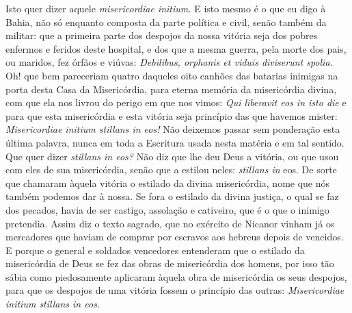 Isto quer dizer aquele \emph{misericordiae initium.} E isto mesmo é o
que eu digo à Bahia, não só enquanto composta da parte política e civil,
senão também da militar: que a primeira parte dos despojos da nossa
vitória seja dos pobres enfermos e feridos deste hospital, e dos que a
mesma guerra, pela morte dos pais, ou maridos, fez órfãos e viúvas:
\emph{Debilibus, orphanis et viduis diviserunt spolia.} Oh! que bem
pareceriam quatro daqueles oito canhões das batarias inimigas na porta
desta Casa da Misericórdia, para eterna memória da misericórdia divina,
com que ela nos livrou do perigo em que nos vimos: \emph{Qui liberavit
eos in isto die} e para que esta misericórdia e esta vitória seja
princípio das que havemos mister: \emph{Misericordiae initium stillans
in eos!} Não deixemos passar sem ponderação esta última palavra, nunca
em toda a Escritura usada nesta matéria e em tal sentido. Que quer dizer
\emph{stillans in eos?} Não diz que lhe deu Deus a vitória, ou que usou
com eles de sua misericórdia, senão que a estilou neles: \emph{stillans
in} eos. De sorte que chamaram àquela vitória o estilado da divina
misericórdia, nome que nós também podemos dar à nossa. Se fora o
estilado da divina justiça, o qual se faz dos pecados, havia de ser
castigo, assolação e cativeiro, que é o que o inimigo pretendia. Assim
diz o texto sagrado, que no exército de Nicanor vinham já os mercadores
que haviam de comprar por escravos aos hebreus depois de vencidos. E
porque o general e soldados vencedores entenderam que o estilado da
misericórdia de Deus se fez das obras de misericórdia dos homens, por
isso tão sábia como piedosamente aplicaram àquela obra de misericórdia
os seus despojos, para que os despojos de uma vitória fossem o princípio
das outras: \emph{Misericordiae initium stillans in eos.}

